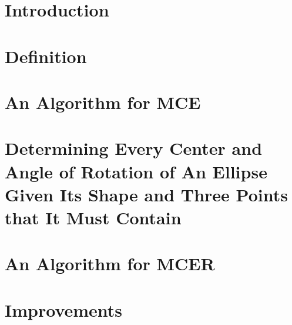 \documentclass[3p, 11pt]{elsarticle}
\begin{document}
		
	

\section{Introduction}\label{section:introduction}



\section{Definition}\label{section:definition}


\section{An Algorithm for MCE}\label{section:mce}



\section{Determining Every Center and Angle of Rotation of An Ellipse Given Its Shape and Three Points that It Must Contain}\label{section:e3p}
	


\section{An Algorithm for MCER}\label{section:mcer}



\section{Improvements}\label{section:improvements}

%

%
\end{document}
